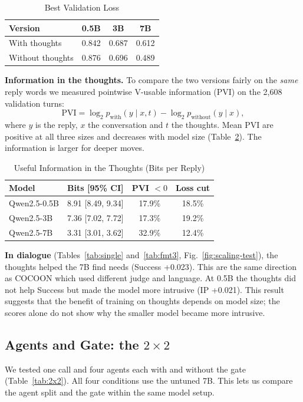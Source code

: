 \documentclass[journal]{IEEEtran}
\newcommand{\tsize}{\footnotesize}
\begin{document}
\begin{table}[!htb]
\caption{Best Validation Loss}
\label{tab:loss}
\centering\tsize
\begin{tabular}{@{}lccc@{}}
\toprule
Version & 0.5B & 3B & 7B\\
\midrule
With thoughts & 0.842 & 0.687 & 0.612\\
Without thoughts & 0.876 & 0.696 & 0.489\\
\bottomrule
\end{tabular}
\end{table}



\textbf{Information in the thoughts.} To compare the two versions fairly on the \emph{same} reply words we measured pointwise V-usable information (PVI) on the 2,608 validation turns:
\[
\text{PVI}=\log_2 p_{\text{with}}(y\mid x,t)-\log_2 p_{\text{without}}(y\mid x),
\]
where $y$ is the reply, $x$ the conversation and $t$ the thoughts. Mean PVI are positive at all three sizes and decreases with model size (Table~\ref{tab:pvi}). The information is larger for deeper moves.

\begin{table}[!htb]
\caption{Useful Information in the Thoughts (Bits per Reply)}
\label{tab:pvi}
\centering\tsize
\begin{tabular}{@{}lccc@{}}
\toprule
Model & Bits [95\% CI] & PVI $<0$ & Loss cut\\
\midrule
Qwen2.5-0.5B & 8.91 [8.49, 9.34] & 17.9\% & 18.5\%\\
Qwen2.5-3B & 7.36 [7.02, 7.72] & 17.3\% & 19.2\%\\
Qwen2.5-7B & 3.31 [3.01, 3.62] & 32.9\% & 12.4\%\\
\bottomrule
\end{tabular}
\end{table}


\textbf{In dialogue} (Tables~\ref{tab:single} and~\ref{tab:fmt3}, Fig.~\ref{fig:scaling-test}), the thoughts helped the 7B find needs (Success +0.023). This are the same direction as COCOON which used different judge and language. At 0.5B the thoughts did not help Success but made the model more intrusive (IP +0.021). This result suggests that the benefit of training on thoughts depends on model size; the scores alone do not show why the smaller model became more intrusive.

\subsection{Agents and Gate: the \texorpdfstring{$2\times2$}{2x2}}\label{sec:a-2x2}
We tested one call and four agents each with and without the gate (Table~\ref{tab:2x2}). All four conditions use the untuned 7B. This lets us compare the agent split and the gate within the same model setup.
\end{document}
